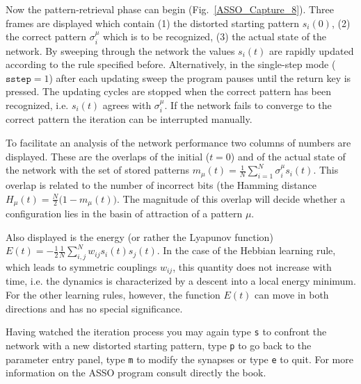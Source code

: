 Now the pattern-retrieval phase can begin (Fig.~\ref{ASSO_Capture_8}). Three frames are displayed which contain (1) the distorted starting pattern $s_i(0)$, (2) the correct pattern $\sigma_i^\mu$ which is to be recognized, (3) the actual state of the network. By sweeping through the network the values $s_i(t)$ are rapidly updated according to the rule specified before. Alternatively, in the single-step mode ($\texttt{sstep}=1$) after each updating sweep the program pauses until the return key is pressed. The updating cycles are stopped when the correct pattern has been recognized, i.e. $s_i(t)$ agrees with $\sigma_i^\mu$. If the network fails to converge to the correct pattern the iteration can be interrupted manually.

To facilitate an analysis of the network performance two columns of numbers are displayed. These are the overlaps of the initial ($t=0$) and of the actual state of the network with the set of stored patterns $m_\mu(t)=\frac{1}{N}\sum_{i=1}^N\sigma_i^\mu s_i(t)$. This overlap is related to the number of incorrect bits (the Hamming distance $H_\mu(t)=\frac{N}{2}\bigl(1-m_\mu(t)\bigr)$. The magnitude of this overlap will decide whether a configuration lies in the basin of attraction of a pattern $\mu$.

Also displayed is the energy (or rather the Lyapunov function) $E(t)=-\frac{1}{2}\frac{1}{N}\sum_{i,j}^Nw_{ij}s_i(t)s_j(t)$. In the case of the Hebbian learning rule, which leads to symmetric couplings $w_{ij}$, this quantity does not increase with time, i.e. the dynamics is characterized by a descent into a local energy minimum. For the other learning rules, however, the function $E(t)$ can move in both directions and has no special significance.

Having watched the iteration process you may again type \texttt{s} to confront the network with a new distorted starting pattern, type \texttt{p} to go back to the parameter entry panel, type \texttt{m} to modify the synapses or type \texttt{e} to quit. For more information on the ASSO program consult directly the book.
